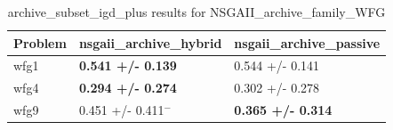\begin{table}
\caption{archive_subset_igd_plus results for NSGAII_archive_family_WFG}
\label{NSGAII_archive_family_WFG_archive_subset_igd_plus}
\begin{tabular}{lll}
\toprule
Problem & nsgaii_archive_hybrid & nsgaii_archive_passive \\
\midrule
wfg1 & \textbf{0.541 +/- 0.139} & 0.544 +/- 0.141 \\
wfg4 & \textbf{0.294 +/- 0.274} & 0.302 +/- 0.278 \\
wfg9 & 0.451 +/- 0.411$^{-}$ & \textbf{0.365 +/- 0.314} \\
\bottomrule
\end{tabular}
\end{table}
